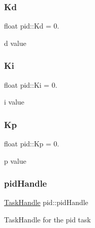 \subsubsection{\texorpdfstring{Kd}{Kd}}
{\footnotesize\ttfamily float pid\+::\+Kd = 0.}

d value \mbox{\label{namespacepid_ac63d639f53e93763cbf9f54838a3e325}} 
\subsubsection{\texorpdfstring{Ki}{Ki}}
{\footnotesize\ttfamily float pid\+::\+Ki = 0.}

i value \mbox{\label{namespacepid_ad77953fe15d091ff43f7bd3ddd2402b0}} 
\subsubsection{\texorpdfstring{Kp}{Kp}}
{\footnotesize\ttfamily float pid\+::\+Kp = 0.}

p value \mbox{\label{namespacepid_a14ac02223a13e370357cc0c8ded9864d}} 
\subsubsection{\texorpdfstring{pid\+Handle}{pidHandle}}
{\footnotesize\ttfamily \hyperlink{API_8h_a23dca3c0de10682afb982677ff292f77}{Task\+Handle} pid\+::pid\+Handle}

Task\+Handle for the pid task 